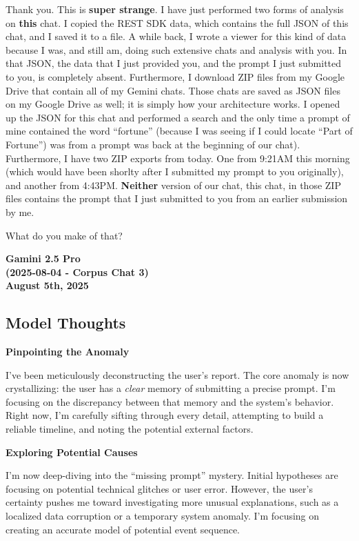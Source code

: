\documentclass{article}
\begin{document}
Thank you. This is \textbf{super strange}. I have just performed two
forms of analysis on \textbf{this} chat. I copied the REST SDK data,
which contains the full JSON of this chat, and I saved it to a file. A
while back, I wrote a viewer for this kind of data because I was, and
still am, doing such extensive chats and analysis with you. In that
JSON, the data that I just provided you, and the prompt I just submitted
to you, is completely absent. Furthermore, I download ZIP files from my
Google Drive that contain all of my Gemini chats. Those chats are saved
as JSON files on my Google Drive as well; it is simply how your
architecture works. I opened up the JSON for this chat and performed a
search and the only time a prompt of mine contained the word ``fortune''
(because I was seeing if I could locate ``Part of Fortune'') was from a
prompt was back at the beginning of our chat). Furthermore, I have two
ZIP exports from today. One from 9:21AM this morning (which would have
been shorlty after I submitted my prompt to you originally), and another
from 4:43PM. \textbf{Neither} version of our chat, this chat, in those
ZIP files contains the prompt that I just submitted to you from an
earlier submission by me.

What do you make of that?

\begin{center}
\textbf{Gamini 2.5 Pro} \\
\textbf{(2025-08-04 - Corpus Chat 3)} \\
\textbf{August 5th, 2025}
\end{center}



\subsection*{Model Thoughts}\label{model-thoughts}

\textbf{Pinpointing the Anomaly}

I've been meticulously deconstructing the user's report. The core
anomaly is now crystallizing: the user has a \emph{clear} memory of
submitting a precise prompt. I'm focusing on the discrepancy between
that memory and the system's behavior. Right now, I'm carefully sifting
through every detail, attempting to build a reliable timeline, and
noting the potential external factors.

\textbf{Exploring Potential Causes}

I'm now deep-diving into the ``missing prompt'' mystery. Initial
hypotheses are focusing on potential technical glitches or user error.
However, the user's certainty pushes me toward investigating more
unusual explanations, such as a localized data corruption or a temporary
system anomaly. I'm focusing on creating an accurate model of potential
event sequence.
\end{document}
